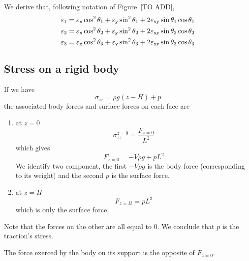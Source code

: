 We derive that, following notation of Figure~[TO ADD],
\begin{align*}
  \varepsilon_{\text{1}} &= \varepsilon_{\text{x}}\cos^2{\theta_1} + \varepsilon_{\text{y}}\sin^2{\theta_1}
  + 2 \varepsilon_{\text{xy}}\sin{\theta_1}\cos{\theta_1} \\
  \varepsilon_{\text{2}} &= \varepsilon_{\text{x}}\cos^2{\theta_2} + \varepsilon_{\text{y}}\sin^2{\theta_2}
  + 2 \varepsilon_{\text{xy}}\sin{\theta_2}\cos{\theta_2} \\
  \varepsilon_{\text{3}} &= \varepsilon_{\text{x}}\cos^2{\theta_3} + \varepsilon_{\text{y}}\sin^2{\theta_3}
  + 2 \varepsilon_{\text{xy}}\sin{\theta_3}\cos{\theta_3}
\end{align*}

\subsection{Stress on a rigid body}
If we have 
\[ \sigma_{zz} = \rho g (z-H) + p \]
the associated body forces and surface forces on each face are
\begin{enumerate}
  \item at $z=0$
  \[ \sigma_{zz}^{z=0} = \frac{F_{z=0}}{L^2} \]
  which gives
  \[ F_{z=0} = - V \rho g + p L^2 \]
  We identify two component, the first $-V \rho g$ is the body force
  (corresponding to its weight) and the second $p$ is the surface force.
  \item at $z=H$
  \[ F_{z=H} = p L^2 \]
  which is only the surface force.
\end{enumerate}

Note that the forces on the other are all equal to $0$.
We conclude that $p$ is the traction's stress.

The force exerced by the body on its support is the opposite
of $F_{z=0}$.
